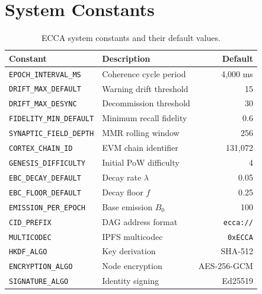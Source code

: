 \documentclass[11pt,twocolumn]{article}
\theoremstyle{definition}
\theoremstyle{plain}
\theoremstyle{remark}
\begin{document}
\section{System Constants}\label{app:constants}

\begin{table}[H]
\centering
\caption{ECCA system constants and their default values.}
\label{tab:constants}
\small
\begin{tabular}{@{}llr@{}}
\toprule
\textbf{Constant} & \textbf{Description} & \textbf{Default}\\
\midrule
\texttt{EPOCH\_INTERVAL\_MS} & Coherence cycle period & 4{,}000 ms\\
\texttt{DRIFT\_MAX\_DEFAULT} & Warning drift threshold & 15\\
\texttt{DRIFT\_MAX\_DESYNC} & Decommission threshold & 30\\
\texttt{FIDELITY\_MIN\_DEFAULT} & Minimum recall fidelity & 0.6\\
\texttt{SYNAPTIC\_FIELD\_DEPTH} & MMR rolling window & 256\\
\texttt{CORTEX\_CHAIN\_ID} & EVM chain identifier & 131{,}072\\
\texttt{GENESIS\_DIFFICULTY} & Initial PoW difficulty & 4\\
\texttt{EBC\_DECAY\_DEFAULT} & Decay rate $\lambda$ & 0.05\\
\texttt{EBC\_FLOOR\_DEFAULT} & Decay floor $f$ & 0.25\\
\texttt{EMISSION\_PER\_EPOCH} & Base emission $B_0$ & 100\\
\texttt{CID\_PREFIX} & DAG address format & \texttt{ecca://}\\
\texttt{MULTICODEC} & IPFS multicodec & \texttt{0xECCA}\\
\texttt{HKDF\_ALGO} & Key derivation & SHA-512\\
\texttt{ENCRYPTION\_ALGO} & Node encryption & AES-256-GCM\\
\texttt{SIGNATURE\_ALGO} & Identity signing & Ed25519\\
\bottomrule
\end{tabular}
\end{table}
\end{document}
